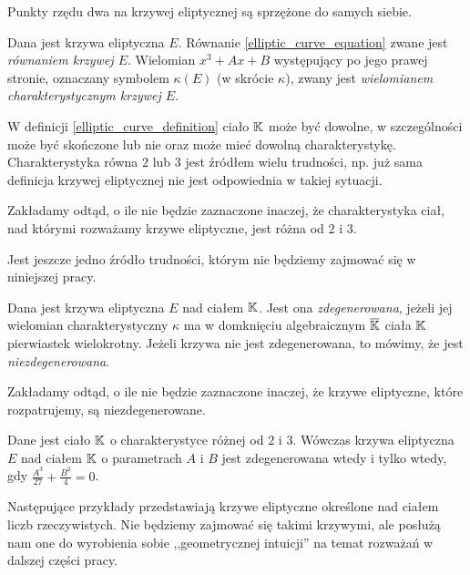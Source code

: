 \begin{fact}
Punkty rzędu dwa na krzywej eliptycznej są sprzężone do samych siebie.
\end{fact}

\begin{definition}
Dana jest krzywa eliptyczna $E$.
Równanie \ref{elliptic_curve_equation} zwane jest \emph{równaniem krzywej $E$}.
Wielomian $x^3 + Ax + B$ występujący po jego prawej stronie,
oznaczany symbolem $\kappa(E)$ (w skrócie $\kappa$),
zwany jest \emph{wielomianem charakterystycznym krzywej $E$}.
\end{definition}

\noindent
W definicji \ref{elliptic_curve_definition} ciało $\mathbb{K}$ może być dowolne,
w szczególności może być skończone lub nie
oraz może mieć dowolną charakterystykę.
Charakterystyka równa $2$ lub $3$ jest źródłem wielu trudności,
np. już sama definicja krzywej eliptycznej
nie jest odpowiednia w takiej sytuacji.

\begin{remark}
Zakładamy odtąd, o ile nie będzie zaznaczone inaczej,
że charakterystyka ciał, nad którymi rozważamy krzywe eliptyczne,
jest różna od $2$ i $3$.
\end{remark}

\noindent
Jest jeszcze jedno źródło trudności,
którym nie będziemy zajmować się w niniejszej pracy.

\begin{definition}
Dana jest krzywa eliptyczna $E$ nad ciałem $\mathbb{K}$.
Jest ona \emph{zdegenerowana},
jeżeli jej wielomian charakterystyczny $\kappa$
ma w domknięciu algebraicznym $\overline{\mathbb{K}}$ ciała $\mathbb{K}$
pierwiastek wielokrotny.
Jeżeli krzywa nie jest zdegenerowana,
to mówimy, że jest \emph{niezdegenerowana}.
\end{definition}

\begin{remark}
Zakładamy odtąd, o ile nie będzie zaznaczone inaczej,
że krzywe eliptyczne, które rozpatrujemy,
są niezdegenerowane.
\end{remark}

\begin{theorem}
Dane jest ciało $\mathbb{K}$ o charakterystyce różnej od $2$ i $3$.
Wówczas krzywa eliptyczna $E$ nad ciałem $\mathbb{K}$ o parametrach $A$ i $B$
jest zdegenerowana wtedy i tylko wtedy,
gdy $\frac{A^3}{27} + \frac{B^2}{4} = 0$.
\end{theorem}

\noindent
Następujące przykłady przedstawiają
krzywe eliptyczne określone nad ciałem liczb rzeczywistych.
Nie będziemy zajmować się takimi krzywymi,
ale posłużą nam one do wyrobienia sobie ,,geometrycznej intuicji''
na temat rozważań w dalszej części pracy.


